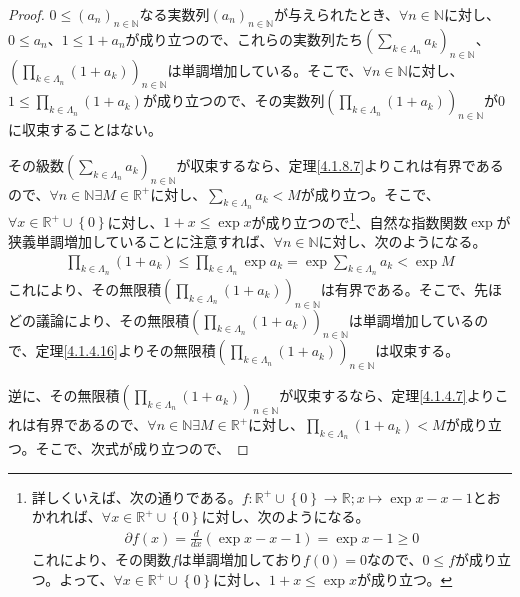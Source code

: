\documentclass[dvipdfmx]{jsarticle}
\begin{document}
\begin{proof}
$0 \leq \left( a_{n} \right)_{n \in \mathbb{N}}$なる実数列$\left( a_{n} \right)_{n \in \mathbb{N}}$が与えられたとき、$\forall n \in \mathbb{N}$に対し、$0 \leq a_{n}$、$1 \leq 1 + a_{n}$が成り立つので、これらの実数列たち$\left( \sum_{k \in \varLambda_{n}} a_{k} \right)_{n \in \mathbb{N}}$、$\left( \prod_{k \in \varLambda_{n}} \left( 1 + a_{k} \right) \right)_{n \in \mathbb{N}}$は単調増加している。そこで、$\forall n \in \mathbb{N}$に対し、$1 \leq \prod_{k \in \varLambda_{n}} \left( 1 + a_{k} \right)$が成り立つので、その実数列$\left( \prod_{k \in \varLambda_{n}} \left( 1 + a_{k} \right) \right)_{n \in \mathbb{N}}$が$0$に収束することはない。\par
その級数$\left( \sum_{k \in \varLambda_{n}} a_{k} \right)_{n \in \mathbb{N}}$が収束するなら、定理\ref{4.1.8.7}よりこれは有界であるので、$\forall n \in \mathbb{N}\exists M \in \mathbb{R}^{+}$に対し、$\sum_{k \in \varLambda_{n}} a_{k} < M$が成り立つ。そこで、$\forall x \in \mathbb{R}^{+} \cup \left\{ 0 \right\}$に対し、$1 + x \leq \exp x$が成り立つので\footnote{詳しくいえば、次の通りである。$f:\mathbb{R}^{+} \cup \left\{ 0 \right\} \rightarrow \mathbb{R};x \mapsto \exp x - x - 1$とおかれれば、$\forall x \in \mathbb{R}^{+} \cup \left\{ 0 \right\}$に対し、次のようになる。
\begin{align*}
\partial f(x) = \frac{d}{dx}\left( \exp x - x - 1 \right) = \exp x - 1 \geq 0
\end{align*}
これにより、その関数$f$は単調増加しており$f(0) = 0$なので、$0 \leq f$が成り立つ。よって、$\forall x \in \mathbb{R}^{+} \cup \left\{ 0 \right\}$に対し、$1 + x \leq \exp x$が成り立つ。}、自然な指数関数$\exp$が狭義単調増加していることに注意すれば、$\forall n \in \mathbb{N}$に対し、次のようになる。
\begin{align*}
\prod_{k \in \varLambda_{n}} \left( 1 + a_{k} \right) \leq \prod_{k \in \varLambda_{n}} {\exp a_{k}} = \exp{\sum_{k \in \varLambda_{n}} a_{k}} < \exp M
\end{align*}
これにより、その無限積$\left( \prod_{k \in \varLambda_{n}} \left( 1 + a_{k} \right) \right)_{n \in \mathbb{N}}$は有界である。そこで、先ほどの議論により、その無限積$\left( \prod_{k \in \varLambda_{n}} \left( 1 + a_{k} \right) \right)_{n \in \mathbb{N}}$は単調増加しているので、定理\ref{4.1.4.16}よりその無限積$\left( \prod_{k \in \varLambda_{n}} \left( 1 + a_{k} \right) \right)_{n \in \mathbb{N}}$は収束する。\par
逆に、その無限積$\left( \prod_{k \in \varLambda_{n}} \left( 1 + a_{k} \right) \right)_{n \in \mathbb{N}}$が収束するなら、定理\ref{4.1.4.7}よりこれは有界であるので、$\forall n \in \mathbb{N}\exists M \in \mathbb{R}^{+}$に対し、$\prod_{k \in \varLambda_{n}} \left( 1 + a_{k} \right) < M$が成り立つ。そこで、次式が成り立つので、

\end{proof}
\end{document}
